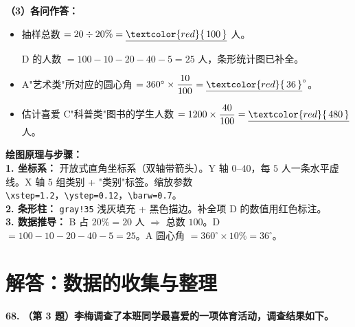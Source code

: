 \vspace{0.4cm}
\textbf{（3）各问作答：}

\begin{itemize}
    \item[\textbf{(1)}] 抽样总数 $= 20 \div 20\% = \underline{\textcolor{red}{\,100\,}}$ 人。

    D 的人数 $= 100 - 10 - 20 - 40 - 5 = 25$ 人，条形统计图已补全。

    \item[\textbf{(2)}] A"艺术类"所对应的圆心角 $= 360^\circ \times \dfrac{10}{100} = \underline{\textcolor{red}{\,36\,}}^\circ$。

    \item[\textbf{(3)}] 估计喜爱 C"科普类"图书的学生人数 $= 1200 \times \dfrac{40}{100} = \underline{\textcolor{red}{\,480\,}}$ 人。
\end{itemize}

\vspace{0.4cm}
{\small\color{blue!70!black}
\textbf{绘图原理与步骤：}\\
\textbf{1. 坐标系：} 开放式直角坐标系（双轴带箭头）。Y 轴 $0$--$40$，每 $5$ 人一条水平虚线。X 轴 5 组类别 + "类别"标签。缩放参数 \texttt{\textbackslash{}xstep=1.2}，\texttt{\textbackslash{}ystep=0.12}，\texttt{\textbackslash{}barw=0.7}。\\
\textbf{2. 条形柱：} \texttt{gray!35} 浅灰填充 + 黑色描边。补全项 D 的数值用红色标注。\\
\textbf{3. 数据推导：} B 占 $20\% = 20$ 人 $\Rightarrow$ 总数 $100$。D $= 100 - 10 - 20 - 40 - 5 = 25$。A 圆心角 $= 360^\circ \times 10\% = 36^\circ$。
}

\newpage



\newpage

\section{解答：数据的收集与整理}

\vspace{0.6cm}

\textbf{\LARGE 68.} \textbf{（第 3 题）李梅调查了本班同学最喜爱的一项体育活动，调查结果如下。}\\


